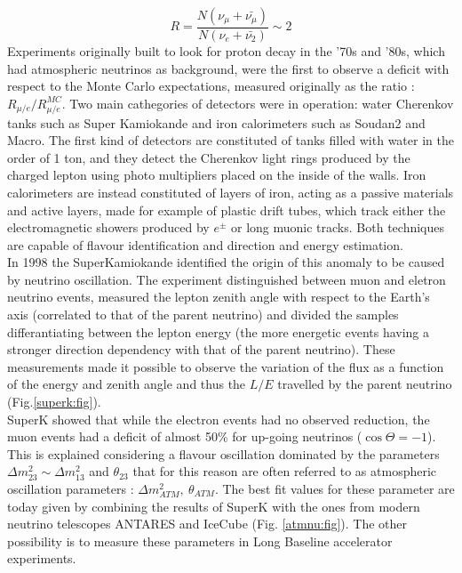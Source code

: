 \documentclass[12pt,a4paper,openright,twoside]{report}
\begin{document}
 \begin{equation}
 R= \frac {N (\nu_\mu + \bar{\nu_\mu})}{N (\nu_e + \bar{\nu_2} )} \sim 2
 \end{equation}
Experiments originally built to look for proton decay in the '70s and '80s, which had atmospheric neutrinos as background, were the first to observe a deficit with respect to the Monte Carlo expectations, measured originally as the ratio : $R_{\mu / e}/ R_{\mu/e}^{MC}$. Two main cathegories of detectors were in operation: water Cherenkov tanks such as Super Kamiokande and iron calorimeters such as Soudan2 and Macro. The first kind of detectors are constituted of tanks filled with water in the order of 1 ton, and they detect the Cherenkov light rings produced by the charged lepton using photo multipliers placed on the inside of the walls. Iron calorimeters are instead constituted of layers of iron, acting as a passive materials and active layers, made for example of plastic drift tubes, which track either the electromagnetic showers produced by $e^\pm$ or long muonic tracks. Both techniques are capable of flavour identification and direction and energy estimation.\\
In 1998 the SuperKamiokande identified the origin of this anomaly to be caused by neutrino oscillation. The experiment distinguished between muon and eletron neutrino events, measured the lepton zenith angle with respect to the Earth's axis (correlated to that of the parent neutrino) and divided the samples differantiating between the lepton energy (the more energetic events having a stronger direction dependency with that of the parent neutrino). These measurements made it possible to observe the variation of the flux as a function of the energy and zenith angle and thus the $L/E$ travelled by the parent neutrino (Fig.\ref{superk:fig}).\\
 SuperK showed that while the electron events had no observed reduction, the muon events had a deficit of almost 50\% for up-going neutrinos ($\cos\Theta = -1$). This is explained considering a flavour oscillation dominated by the parameters $\Delta m_{23}^2 \sim \Delta m_{13}^2$ and $\theta_{23}$ that for this reason are often referred to as atmospheric oscillation parameters : $\Delta m_{ATM}^2, \ \theta_{ATM}$. The best fit values for these parameter are today given by combining the results of SuperK with the ones from modern neutrino telescopes ANTARES and IceCube (Fig. \ref{atmnu:fig}). The other possibility is to measure these parameters in Long Baseline accelerator experiments.
\end{document}
